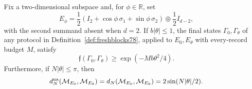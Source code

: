 \begin{lemma}
\label{lem:blockfidelity78}
Fix a two-dimensional subspace and, for $\phi\in\mathbb R$, set
\begin{equation}\label{eq:blockprojective78}
 E_\phi=\frac12(I_2+\cos\phi\,\sigma_1+
                         \sin\phi\,\sigma_2)
                   \mathbin\oplus\frac12 I_{d-2},
\end{equation}
with the second summand absent when $d=2$.  If $b|\theta|\le1$,
the final states $\Gamma_0,\Gamma_\theta$ of any protocol in
Definition~\ref{def:freshblocks78}, applied to $E_0,E_\theta$ with
every-record budget $M$, satisfy
\begin{equation}\label{eq:blockfidelity78}
 \mathfrak f(\Gamma_0,\Gamma_\theta)
 \ge\exp(-Mb\theta^2/4).
\end{equation}
Furthermore, if $N|\theta|\le\pi$, then
\begin{equation}\label{eq:blockprojectivedistance78}
 d_N^{\rm na}(\mathcal M_{E_0},\mathcal M_{E_\theta})
 =d_N(\mathcal M_{E_0},\mathcal M_{E_\theta})
 =2\sin(N|\theta|/2).
\end{equation}
\end{lemma}
